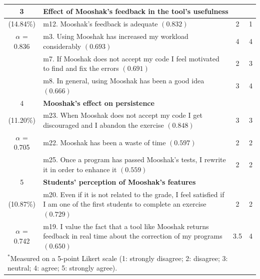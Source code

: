 \begin{table}
\begin{scriptsize}
\begin{tabular}{clcc}
   \hline
    3 & \multicolumn{3}{l}{\textbf{Effect of Mooshak's feedback in the tool's usefulness} } \\
   \hline
    (14.84\%) & m12. Mooshak's feedback is adequate $(0.832)$ & 2 & 1\\
    $\alpha$ = 0.836 & m3. Using Mooshak has increased my workload considerably $(0.693)$ & 4 & 4 \\
     & m7.  If Mooshak does not accept my code I feel motivated to find and fix the errors $(0.691)$ & 2 & 3 \\
     & m8.  In general, using Mooshak has been a good idea $(0.666)$ & 3 & 4 \\
   \hline
    4 & \multicolumn{3}{l}{\textbf{Mooshak's effect on persistence} } \\
   \hline
    (11.20\%) & m23. When Mooshak does not accept my code I get discouraged and I abandon the exercise $(0.848)$ & 3 & 3 \\
    $\alpha$ = 0.705 & m22. Mooshak has been a waste of time $(0.597)$ & 2 & 2 \\
    & m25. Once a program has passed Mooshak's tests, I rewrite it in order to enhance it $(0.559)$ & 2 & 2 \\
   \hline
   5 & \multicolumn{3}{l}{\textbf{Students' perception of Mooshak's features} } \\
   \hline
    (10.87\%) & m20. Even if it is not related to the grade, I feel satisfied if I am one of the first students to complete an exercise $(0.729)$ & 2 & 2\\
   $\alpha$ = 0.742  & m19. I value the fact that a tool like Mooshak returns feedback in real time about the correction of my programs $(0.650)$ & 3.5 & 4 \\
   \hline
\multicolumn{4}{l}{\scriptsize $^{*}$Measured on a 5-point Likert scale (1: strongly disagree; 2: disagree; 3: neutral; 4: agree; 5: strongly agree).}
  \end{tabular}
\end{scriptsize}
\end{table}



